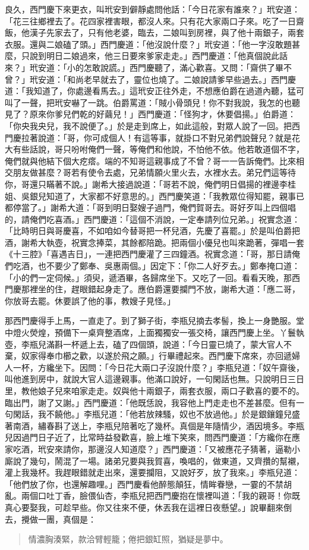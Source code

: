 良久，西門慶下來更衣，叫玳安到僻靜處問他話：「今日花家有誰來？」玳安道：「花三往鄉裡去了。花四家裡害眼，都沒人來。只有花大家兩口子來。吃了一日齋飯，他漢子先家去了，只有他老婆，臨去，二娘叫到房裡，與了他十兩銀子，兩套衣服。還與二娘磕了頭。」西門慶道：「他沒說什麼？」玳安道：「他一字沒敢題甚麼，只說到明日二娘過來，他三日要來爹家走走。」西門慶道：「他真個說此話來？」玳安道：「小的怎敢說謊。」西門慶聽了，滿心歡喜。又問：「齋供了畢不曾？」玳安道：「和尚老早就去了，靈位也燒了。二娘說請爹早些過去。」西門慶道：「我知道了，你處邊看馬去。」這玳安正往外走，不想應伯爵在過道內聽，猛可叫了一聲，把玳安嚇了一跳。伯爵罵道：「賊小骨頭兒！你不對我說，我怎的也聽見了？原來你爹兒們乾的好繭兒！」西門慶道：「怪狗才，休要倡揚。」伯爵道：「你央我央兒，我不說便了。」於是走到席上，如此這般，對眾人說了一回。把西門慶拉著說道：「哥，你可成個人！有這等事，就掛口不對兄弟們說聲兒？就是花大有些話說，哥只吩咐俺們一聲，等俺們和他說，不怕他不依。他若敢道個不字，俺們就與他結下個大疙瘩。端的不知哥這親事成了不曾？哥一一告訴俺們。比來相交朋友做甚麼？哥若有使令去處，兄弟情願火里火去，水裡水去。弟兄們這等待你，哥還只瞞著不說。」謝希大接過說道：「哥若不說，俺們明日倡揚的裡邊李桂姐、吳銀兒知道了，大家都不好意思的。」西門慶笑道：「我教眾位得知罷，親事已都停當了。」謝希大道：「哥到明日娶嫂子過門，俺們賀哥去。哥好歹叫上四個唱的，請俺們吃喜酒。」西門慶道：「這個不消說，一定奉請列位兄弟。」祝實念道：「比時明日與哥慶喜，不如咱如今替哥把一杯兒酒，先慶了喜罷。」於是叫伯爵把酒，謝希大執壺，祝實念捧菜，其餘都陪跪。把兩個小優兒也叫來跪著，彈唱一套《十三腔》「喜遇吉日」，一連把西門慶灌了三四鐘酒。祝實念道：「哥，那日請俺們吃酒，也不要少了鄭奉、吳惠兩個。」因定下：「你二人好歹去。」鄭奉掩口道：「小的們一定伺候。」須臾，遞酒畢，各歸席坐下。又吃了一回。看看天晚，那西門慶那裡坐的住，趕眼錯起身走了。應伯爵還要攔門不放，謝希大道：「應二哥，你放哥去罷。休要誤了他的事，教嫂子見怪。」

那西門慶得手上馬，一直走了。到了獅子街，李瓶兒摘去孝髻，換上一身艷服。堂中燈火熒煌，預備下一桌齊整酒席，上面獨獨安一張交椅，讓西門慶上坐。丫鬟執壺，李瓶兒滿斟一杯遞上去，磕了四個頭，說道：「今日靈已燒了，蒙大官人不棄，奴家得奉巾櫛之歡，以遂於飛之願。」行畢禮起來。西門慶下席來，亦回遞婦人一杯，方纔坐下。因問：「今日花大兩口子沒說什麼？」李瓶兒道：「奴午齋後，叫他進到房中，就說大官人這邊親事。他滿口說好，一句閑話也無。只說明日三日里，教他娘子兒來咱家走走。奴與他十兩銀子，兩套衣服，兩口子歡喜的要不的。臨出門，謝了又謝。」西門慶道：「他既恁說，我容他上門走走也不差甚麼。但有一句閑話，我不饒他。」李瓶兒道：「他若放辣騷，奴也不放過他。」於是銀鑲鐘兒盛著南酒，繡春斟了送上，李瓶兒陪著吃了幾杯。真個是年隨情少，酒因境多。李瓶兒因過門日子近了，比常時益發歡喜，臉上堆下笑來，問西門慶道：「方纔你在應家吃酒，玳安來請你，那邊沒人知道麼？」西門慶道：「又被應花子猜著，逼勒小廝說了幾句，鬧混了一場。諸弟兄要與我賀喜，喚唱的，做東道，又齊攢的幫襯，灌上我幾杯。我趕眼錯就走出來，還要攔阻，又說好歹，放了我來。」李瓶兒道：「他們放了你，也還解趣哩。」西門慶看他醉態顛狂，情眸眷戀，一霎的不禁胡亂。兩個口吐丁香，臉偎仙杏，李瓶兒把西門慶抱在懷裡叫道：「我的親哥！你既真心要娶我，可趁早些。你又往來不便，休丟我在這裡日夜懸望。」說畢翻來倒去，攪做一團，真個是：
\begin{quote}
情濃胸湊緊，款洽臂輕籠；倦把銀缸照，猶疑是夢中。
\end{quote}
